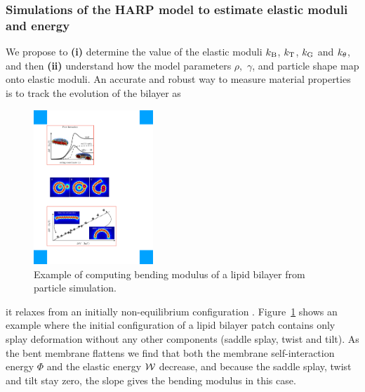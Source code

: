 \subsubsection{Simulations of the HARP model to estimate elastic moduli and energy}
We propose to
%
%
%
{\bf (i)} determine the value of the elastic moduli $k_{\mathrm{B}}$,
$k_{\mathrm{T}}$, $k_{\mathrm{G}}$ and $k_{\theta}$, and then {\bf (ii)} understand how the model parameters $\rho,$ $\gamma$, and particle shape map onto elastic moduli. 
An accurate and robust way to measure material properties is to track the evolution of the bilayer as
%
\begin{figure}
\vspace{-0.3cm}
\centerline{\includegraphics[width=0.4\textwidth]{Figures/Flattening.pdf}}
\vspace{-0.2cm}
\caption{\label{fig:flattening} \footnotesize Example of computing
  bending modulus of a lipid bilayer from particle simulation.}
\end{figure}
it relaxes from an initially non-equilibrium configuration \cite{PhysRevLett.117.188102}.
Figure~\ref{fig:flattening} shows an example where the initial configuration of a lipid bilayer patch contains only
splay deformation without any other components (saddle splay, twist and tilt). 
As the bent membrane flattens we find that both the membrane self-interaction energy $\Phi$ and the elastic energy ${\cal W}$ decrease,
and because the saddle splay, twist and tilt stay zero, the slope gives the bending modulus in this case. 


